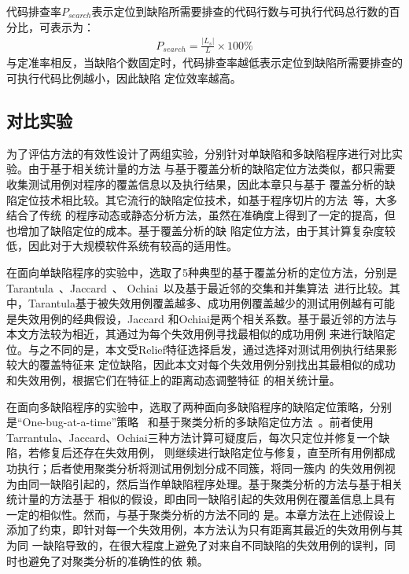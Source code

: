 代码排查率$P_{search}$表示定位到缺陷所需要排查的代码行数与可执行代码总行数的百分比，可表示为：
\begin{eqnarray}
      P_{search}=\frac{|L_s|}{L}\times100\%
\end{eqnarray}
与定准率相反，当缺陷个数固定时，代码排查率越低表示定位到缺陷所需要排查的可执行代码比例越小，因此缺陷
定位效率越高。

\subsection{对比实验}
为了评估方法的有效性设计了两组实验，分别针对单缺陷和多缺陷程序进行对比实验。由于基于相关统计量的方法
与基于覆盖分析的缺陷定位方法类似，都只需要收集测试用例对程序的覆盖信息以及执行结果，因此本章只与基于
覆盖分析的缺陷定位技术相比较。其它流行的缺陷定位技术，如基于程序切片的方法~\cite{}等，大多结合了传统
的程序动态或静态分析方法，虽然在准确度上得到了一定的提高，但也增加了缺陷定位的成本。基于覆盖分析的缺
陷定位方法，由于其计算复杂度较低，因此对于大规模软件系统有较高的适用性。


在面向单缺陷程序的实验中，选取了5种典型的基于覆盖分析的定位方法，分别是
Tarantula~\cite{jones2005empirical}、Jaccard~\cite{abreu2007accuracy}、
Ochiai~\cite{abreu2007accuracy}以及基于最近邻的交集和并集算法~\cite{renieres2003fault}进行比较。其
中，Tarantula基于被失效用例覆盖越多、成功用例覆盖越少的测试用例越有可能是失效用例的经典假设，Jaccard
和Ochiai是两个相关系数。基于最近邻的方法与本文方法较为相近，其通过为每个失效用例寻找最相似的成功用例
来进行缺陷定位。与之不同的是，本文受Relief特征选择启发，通过选择对测试用例执行结果影较大的覆盖特征来
定位缺陷，因此本文对每个失效用例分别找出其最相似的成功和失效用例，根据它们在特征上的距离动态调整特征
的相关统计量。

在面向多缺陷程序的实验中，选取了两种面向多缺陷程序的缺陷定位策略，分别是``One-bug-at-a-time''策略
~\cite{klahr1988cognitive}和基于聚类分析的多缺陷定位方法~\cite{jones2007debugging}。前者使用
Tarrantula、Jaccard、Ochiai三种方法计算可疑度后，每次只定位并修复一个缺陷，若修复后还存在失效用例，
则继续进行缺陷定位与修复，直至所有用例都成功执行；后者使用聚类分析将测试用例划分成不同簇，将同一簇内
的失效用例视为由同一缺陷引起的，然后当作单缺陷程序处理。基于聚类分析的方法与基于相关统计量的方法基于
相似的假设，即由同一缺陷引起的失效用例在覆盖信息上具有一定的相似性。然而，与基于聚类分析的方法不同的
是。本章方法在上述假设上添加了约束，即针对每一个失效用例，本方法认为只有距离其最近的失效用例与其为同
一缺陷导致的，在很大程度上避免了对来自不同缺陷的失效用例的误判，同时也避免了对聚类分析的准确性的依
赖。

